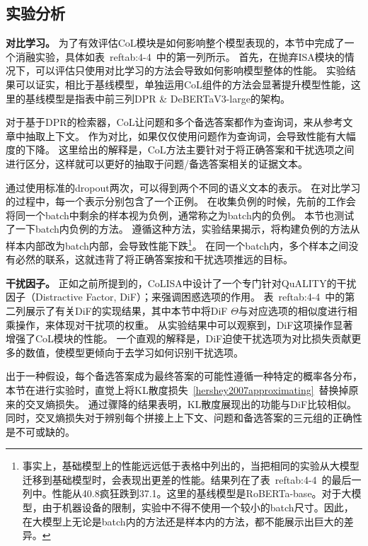 \subsection{实验分析}



\noindent \textbf{对比学习。}
为了有效评估CoL模块是如何影响整个模型表现的，本节中完成了一个消融实验，具体如表~ref{tab:4-4}~中的第一列所示。
首先，在抛弃ISA模块的情况下，可以评估只使用对比学习的方法会导致如何影响模型整体的性能。
实验结果可以证实，相比于基线模型，单独运用CoL组件的方法会显著提升模型性能，这里的基线模型是指表中前三列DPR \& DeBERTaV3-large的架构。

对于基于DPR的检索器，CoL让问题和多个备选答案都作为查询词，来从参考文章中抽取上下文。
作为对比，如果仅仅使用问题作为查询词，会导致性能有大幅度的下降。
这里给出的解释是，CoL方法主要针对于将正确答案和干扰选项之间进行区分，这样就可以更好的抽取于问题/备选答案相关的证据文本。

通过使用标准的dropout两次，可以得到两个不同的语义文本的表示。
在对比学习的过程中，每一个表示分别包含了一个正例。
在收集负例的时候，先前的工作会将同一个batch中剩余的样本视为负例，通常称之为batch内的负例\cite{gao2021simcse}。
本节也测试了一下batch内负例的方法。
遵循这种方法，实验结果揭示，将构建负例的方法从样本内部改为batch内部，会导致性能下跌\footnote{事实上，基础模型上的性能远远低于表格中列出的，当把相同的实验从大模型迁移到基础模型时，会表现出更差的性能。结果列在了表~ref{tab:4-4}~的最后一列中。性能从40.8疯狂跌到37.1。这里的基线模型是RoBERTa-base。对于大模型，由于机器设备的限制，实验中不得不使用一个较小的batch尺寸。因此，在大模型上无论是batch内的方法还是样本内的方法，都不能展示出巨大的差异。}。
在同一个batch内，多个样本之间没有必然的联系，这就违背了将正确答案按和干扰选项推远的目标。

\noindent \textbf{干扰因子。}
正如之前所提到的，CoLISA中设计了一个专门针对QuALITY的干扰因子（Distractive Factor, DiF）；来强调困惑选项的作用。
表~ref{tab:4-4}~中的第二列展示了有关DiF的实现结果，其中本节中将DiF $\Theta$与对应选项的相似度进行相乘操作，来体现对干扰项的权重。
从实验结果中可以观察到，DiF这项操作显著增强了CoL模块的性能。
一个直观的解释是，DiF迫使干扰选项为对比损失贡献更多的数值，使模型更倾向于去学习如何识别干扰选项。

出于一种假设，每个备选答案成为最终答案的可能性遵循一种特定的概率各分布，本节在进行实验时，直觉上将KL散度损失~\ref{hershey2007approximating}~替换掉原来的交叉熵损失。
通过骤降的结果表明，KL散度展现出的功能与DiF比较相似。
同时，交叉熵损失对于辨别每个拼接上上下文、问题和备选答案的三元组的正确性是不可或缺的。

